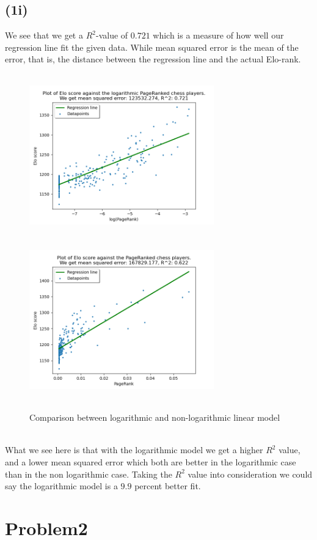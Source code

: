 \documentclass[12pt, letterpaper]{article}
\begin{document}
    \subsection*{(1i)}
      We see that we get a $R^2$-value of $0.721$ which is a measure of how well our regression line fit the given data. While mean squared error is the mean of the error, that is, the distance between the regression line and the actual Elo-rank.\\
      \begin{figure}[h]
        \caption{Comparison between logarithmic and non-logarithmic linear model}
        \centering
        \includegraphics[width=8cm, height=7cm]{logarithmic}
        \includegraphics[width=8cm, height=7cm]{nonlogarithmic}
      \end{figure}\\
      What we see here is that with the logarithmic model we get a higher $R^2$ value, and a lower mean squared error which both are better in the logarithmic case than in the non logarithmic case. Taking the $R^2$ value into consideration we could say the logarithmic model is a $9.9$ percent better fit.
  \newpage
  \section*{Problem2}
\end{document}
